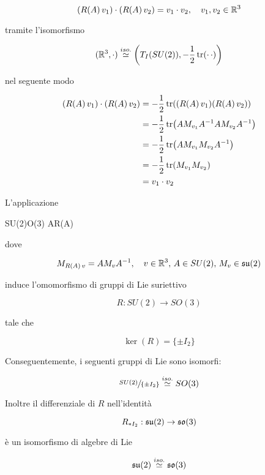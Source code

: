 \begin{equation}
	(R(A) \, v_{1}) \cdot (R(A) \, v_{2}) = v_{1} \cdot v_{2} \qcomma v_{1},v_{2} \in \R^{3}
\end{equation}

tramite l'isomorfismo

\begin{equation}
	(\mathbb{R}^{3},\cdot) \stackrel{iso.}{\simeq} \left( T_{I}(SU(2)), -\dfrac{1}{2} \tr(\cdot \, \cdot) \right)
\end{equation}

nel seguente modo

\begin{align}
	\begin{split}
		(R(A) \, v_{1}) \cdot (R(A) \, v_{2}) &= - \dfrac{1}{2} \tr( (R(A) \, v_{1}) (R(A) \, v_{2}) )\\
		&= - \dfrac{1}{2} \tr( A M_{v_{1}} A^{-1} A M_{v_{2}} A^{-1} )\\
		&= - \dfrac{1}{2} \tr( A M_{v_{1}} M_{v_{2}} A^{-1} )\\
		&= - \dfrac{1}{2} \tr( M_{v_{1}} M_{v_{2}} )\\
		&= v_{1} \cdot v_{2}
	\end{split}
\end{align}

\begin{theorem}
	L'applicazione
	
		{SU(2)}{O(3)}%
		{A}{R(A)}
	
	dove
	
	\begin{equation}
		 M_{R(A) \, v} = A M_{v} A^{-1} \qcomma v \in \R^{3}, \, A \in SU(2), \, M_{v} \in \su(2)
	\end{equation}

	induce l'omomorfismo di gruppi di Lie suriettivo
	
	\begin{equation}
		R : SU(2) \to SO(3)
	\end{equation}

	tale che
	
	\begin{equation}
		\ker(R) = \{ \pm I_{2} \}
	\end{equation}

	Conseguentemente, i seguenti gruppi di Lie sono isomorfi:
	
	\begin{equation}
		\sfrac{SU(2)}{\{ \pm I_{2}\}} \stackrel{iso.}{\simeq} SO(3)
	\end{equation}

	Inoltre il differenziale di $ R $ nell'identità 
	
	\begin{equation}
		R_{*I_{2}} : \mathfrak{su}(2) \to \mathfrak{so}(3)
	\end{equation}

	è un isomorfismo di algebre di Lie
	
	\begin{equation}
		\mathfrak{su}(2) \stackrel{iso.}{\simeq} \mathfrak{so}(3)
	\end{equation}
\end{theorem}

